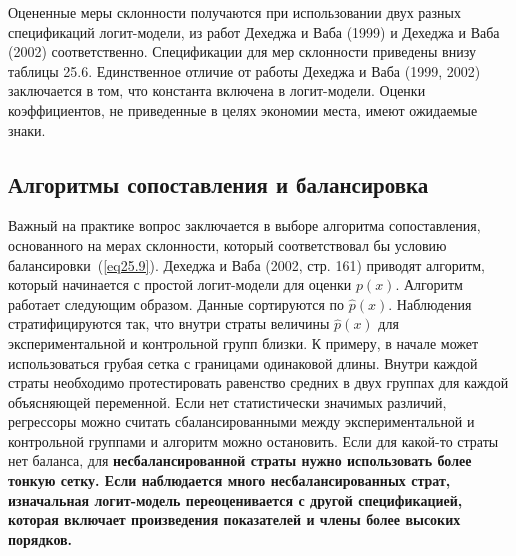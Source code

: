 Оцененные меры склонности получаются при использовании двух разных спецификаций логит-модели, из работ Дехеджа и Ваба (1999) и Дехеджа и Ваба (2002) соответственно. Спецификации для мер склонности приведены внизу таблицы 25.6. Единственное отличие от работы Дехеджа и Ваба (1999, 2002) заключается в том, что константа включена в логит-модели. Оценки коэффициентов, не приведенные в целях экономии места, имеют ожидаемые знаки. 

\subsection*{Алгоритмы сопоставления и балансировка}

Важный на практике вопрос заключается в выборе алгоритма сопоставления, основанного на мерах склонности, который соответствовал бы условию балансировки~(\ref{eq25.9}). Дехеджа и Ваба (2002, стр. 161) приводят алгоритм, который начинается с простой логит-модели для оценки $p(x)$. Алгоритм работает следующим образом. Данные сортируются по $\widehat p(x)$. Наблюдения стратифицируются так, что внутри страты величины $\widehat p(x)$ для экспериментальной и контрольной групп близки. К примеру, в начале может использоваться грубая сетка с границами одинаковой длины. Внутри каждой страты необходимо протестировать равенство средних в двух группах для каждой объясняющей переменной. Если нет статистически значимых различий, регрессоры можно считать сбалансированными между экспериментальной и контрольной группами и алгоритм можно остановить. Если для какой-то страты нет баланса, для \bfseries несбалансированной страты \mdseries нужно использовать более тонкую сетку. Если наблюдается много несбалансированных страт, изначальная логит-модель переоценивается с другой спецификацией, которая включает произведения показателей и члены более высоких порядков. 

